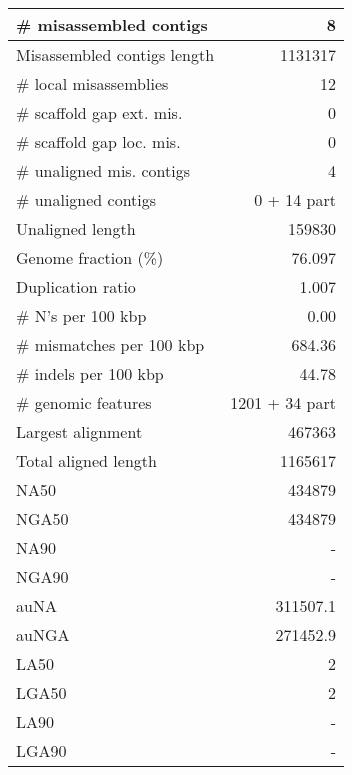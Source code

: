 \documentclass[12pt,a4paper]{article}
\begin{document}
\begin{table}[ht]
\begin{center}
\begin{tabular}{|l*{1}{|r}|}
\# misassembled contigs & 8 \\ \hline
Misassembled contigs length & 1131317 \\ \hline
\# local misassemblies & 12 \\ \hline
\# scaffold gap ext. mis. & 0 \\ \hline
\# scaffold gap loc. mis. & 0 \\ \hline
\# unaligned mis. contigs & 4 \\ \hline
\# unaligned contigs & 0 + 14 part \\ \hline
Unaligned length & 159830 \\ \hline
Genome fraction (\%) & 76.097 \\ \hline
Duplication ratio & 1.007 \\ \hline
\# N's per 100 kbp & 0.00 \\ \hline
\# mismatches per 100 kbp & 684.36 \\ \hline
\# indels per 100 kbp & 44.78 \\ \hline
\# genomic features & 1201 + 34 part \\ \hline
Largest alignment & 467363 \\ \hline
Total aligned length & 1165617 \\ \hline
NA50 & 434879 \\ \hline
NGA50 & 434879 \\ \hline
NA90 & - \\ \hline
NGA90 & - \\ \hline
auNA & 311507.1 \\ \hline
auNGA & 271452.9 \\ \hline
LA50 & 2 \\ \hline
LGA50 & 2 \\ \hline
LA90 & - \\ \hline
LGA90 & - \\ \hline
\end{tabular}
\end{center}
\end{table}
\end{document}
